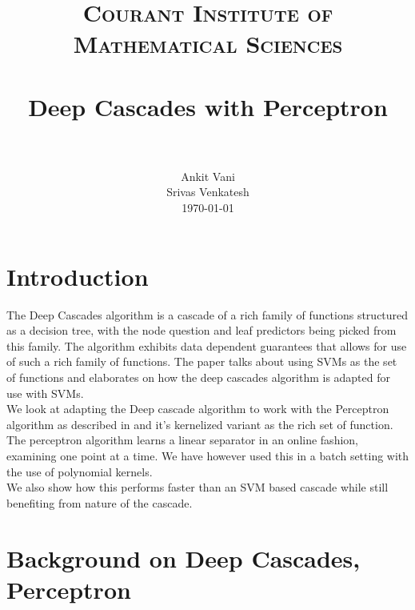 \documentclass[paper=letter, fontsize=11pt]{scrartcl}
\title{
		\usefont{OT1}{bch}{b}{n}
		\normalfont \normalsize \textsc{Courant Institute of Mathematical Sciences} \\ [25pt]
		\horrule{0.5pt} \\[0.4cm]
		\huge Deep Cascades with Perceptron \\
		\horrule{2pt} \\[0.5cm]
}
\author{
		\normalfont 								\normalsize
        Ankit Vani\\ \normalsize Srivas Venkatesh\\[-3pt]		\normalsize
        \today
}
\date{}
\numberwithin{equation}{section}		%
\numberwithin{figure}{section}			%
\numberwithin{table}{section}				%
\begin{document}
\maketitle
\section{Introduction}

The Deep Cascades \cite{deepcascades} algorithm is a cascade of a rich family of functions structured as a decision tree, with the  node question and leaf predictors being picked from this family. The algorithm exhibits data dependent guarantees that allows for use of such a rich family of functions. The paper talks about using SVMs as the set of functions and elaborates on how the deep cascades algorithm is adapted for use with SVMs.
\\We look at adapting the Deep cascade algorithm to work with the Perceptron algorithm as described in \cite{rosenblatt1958perceptron} and it's kernelized variant \cite{kernelizedperceptron} as the rich set of function. The perceptron algorithm learns a linear separator in an online fashion, examining one point at a time. We have however used this in a batch setting with the use of polynomial kernels.
\\We also show how this performs faster than an SVM based cascade while still benefiting from nature of the cascade.
\section{Background on Deep Cascades, Perceptron}
\end{document}
